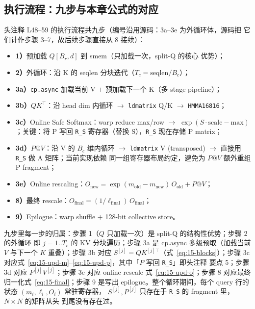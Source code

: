 \subsection{执行流程：九步与本章公式的对应}

头注释 L48--59 的执行流程共九步（编号沿用源码：3a--3e 为外循环体，源码把
它们计作步骤 3--7，故后续步骤直接从 8 接续）：
\begin{itemize}
  \item \textbf{1）}预加载 $Q[B_r, d]$ 到 smem（只加载一次，split-Q 的核心
        优势）；
  \item \textbf{2）}外循环：沿 K 的 seqlen 分块迭代（$T_c =
        \mathrm{seqlen}/B_c$）；
  \item \textbf{3a）}\texttt{cp.async} 加载当前 V $+$ 预加载下一个 K（多
        stage pipeline）；
  \item \textbf{3b）}$QK^{\top}$：沿 head dim 内循环 $\to$ \texttt{ldmatrix}
        Q/K $\to$ \texttt{HMMA16816}；
  \item \textbf{3c）}Online Safe Softmax：warp reduce max/row $\to$
        $\exp(S \cdot \mathrm{scale} - \mathrm{max})$；关键：将 P 写回
        \texttt{R\_S} 寄存器（替换 S），\texttt{R\_S} 现在存储 P matrix；
  \item \textbf{3d）}$P@V$：沿 V 的 $B_c$ 维内循环 $\to$ \texttt{ldmatrix}
        V (transposed) $\to$ 直接用 \texttt{R\_S} 做 A 矩阵；当前实现依赖
        同一组寄存器布局约定，避免为 $P@V$ 额外重组 P fragment；
  \item \textbf{3e）}Online rescaling：$O_{\text{new}} =
        \exp(m_{\text{old}} - m_{\text{new}})\,O_{\text{old}} + P@V$；
  \item \textbf{8）}最终 rescale：$O_{\text{final}} =
        (1/\ell_{\text{final}})\,O_{\text{final}}$；
  \item \textbf{9）}Epilogue：warp shuffle $+$ 128-bit collective store。
\end{itemize}

九步里每一步的归属：步骤 1（$Q$ 只加载一次）是 split-Q 的结构性优势；步骤 2 的外循环
即 $j = 1..T_c$ 的 KV 分块遍历；步骤 3a 是 cp.async 多级预取（加载当前 $V$ 与下一个
$K$ 重叠）；步骤 3b 对应 $S^{[j]} = QK^{[j]\top}$（式~\ref{eq:15-blocks}）；步骤 3c
对应式~\ref{eq:15-upd-m}--\ref{eq:15-upd-p}，其中「$P$ 写回 \texttt{R\_S}」即头注释
要点 5；步骤 3d 对应 $P^{[j]}V^{[j]}$；步骤 3e 对应 online rescale
式~\ref{eq:15-upd-o}；步骤 8 对应最终归一化式~\ref{eq:15-final}；步骤 9 是写出
epilogue。整个循环期间，每个 query 行的状态 $(m_i, \ell_i, O_i)$ 常驻寄存器，
$S^{[j]}, P^{[j]}$ 只存在于 \texttt{R\_S} 的 fragment 里，$N \times N$ 的矩阵从头
到尾没有存在过。

